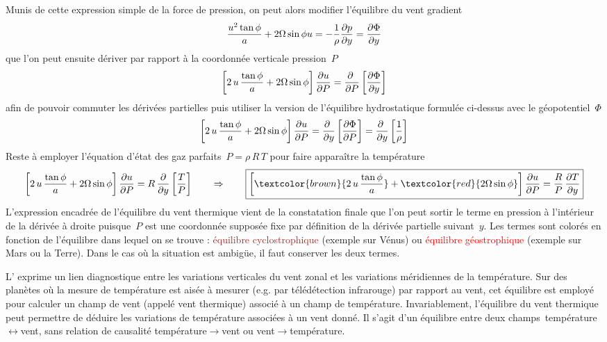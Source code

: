 \sk
Munis de cette expression simple de la force de pression, on peut alors modifier l'équilibre du vent gradient
\[ \dfrac{u^2\tan\phi}{a} + 2\Omega\sin\phi u = -\dfrac{1}{\rho}\dfrac{\partial p }{\partial y} = \frac{\partial \Phi}{\partial y} \]
\noindent que l'on peut ensuite dériver par rapport à la coordonnée verticale pression~$P$ 
\[ \left[ 2 \, u \, \dfrac{\tan\phi}{a} + 2\Omega\sin\phi \right] \dfrac{\partial u }{\partial P} = \dfrac{\partial ~ }{\partial P} \left[ \frac{\partial \Phi}{\partial y} \right] \]
\noindent afin de pouvoir commuter les dérivées partielles puis utiliser la version de l'équilibre hydrostatique formulée ci-dessus avec le géopotentiel~$\Phi$
\[ \left[ 2 \, u \, \dfrac{\tan\phi}{a} + 2\Omega\sin\phi \right] \dfrac{\partial u }{\partial P} = \dfrac{\partial ~ }{\partial y} \left[ \frac{\partial \Phi}{\partial P} \right] = \dfrac{\partial ~ }{\partial y} \left[ \frac{1}{\rho} \right] \]
\noindent Reste à employer l'équation d'état des gaz parfaits~$P=\rho\,R\,T$ pour faire apparaître la température
\[ \left[ 2 \, u \, \dfrac{\tan\phi}{a} + \fcoriolis \right] \der{u}{P} = R \, \frac{\partial}{\partial y} \left[ \frac{T}{P} \right] 
\qquad \Rightarrow \qquad
\boxed{ \left[ \textcolor{brown}{2\,u\,\frac{\tan\phi}{a}} + \textcolor{red}{\fcoriolis} \right] \der{u}{P} = \frac{R}{P} \, \frac{\partial T}{\partial y} }
\]
\noindent L'expression encadrée de l'équilibre du vent thermique vient de la constatation finale que l'on peut sortir le terme en pression à l'intérieur de la dérivée à droite puisque~$P$ est une coordonnée supposée fixe par définition de la dérivée partielle suivant~$y$. Les termes sont colorés en fonction de l'équilibre dans lequel on se trouve : \textcolor{brown}{équilibre cyclostrophique} (exemple sur Vénus) ou \textcolor{red}{équilibre géostrophique} (exemple sur Mars ou la Terre). Dans le cas où la situation est ambigüe, il faut conserver les deux termes.

\sk
L' exprime un lien diagnostique entre les variations verticales du vent zonal et les variations méridiennes de la température. Sur des planètes où la mesure de température est aisée à mesurer (e.g. par télédétection infrarouge) par rapport au vent, cet équilibre est employé pour calculer un champ de vent (appelé vent thermique) associé à un champ de température. Invariablement, l'équilibre du vent thermique peut permettre de déduire les variations de température associées à un vent donné. Il s'agit d'un équilibre entre deux champs~température$\leftrightarrow$vent, sans relation de causalité température$\rightarrow$vent ou vent$\rightarrow$température.

